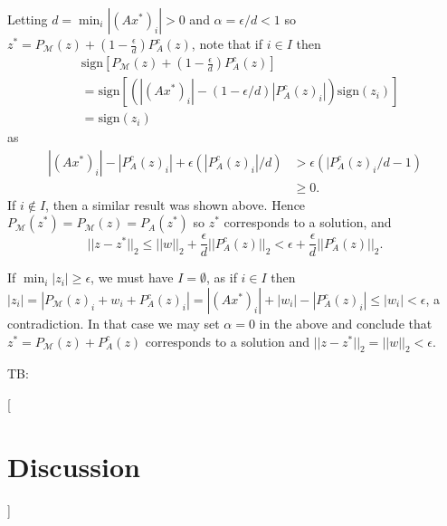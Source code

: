 \documentclass[journal]{IEEEtran}
\theoremstyle{definition}
\theoremstyle{remark}
\theoremstyle{definition}
\theoremstyle{problem}
\theoremstyle{definition}
\newcommand{\sign}{\text{sign}}
\newcommand{\MM}{\mathcal{M}}
\newcommand{\tb}[1]{{\color{blue}TB: {[#1]}}}
\begin{document}
Letting $d = \min_i|(Ax^*)_i| > 0$ and $\alpha = \epsilon/d<1$ so $z^* = P_{\MM}(z) + (1-\frac{\epsilon}{d})P_A^c(z)$, note that if $i\in I$ then
\[\begin{aligned}
&\sign\left[P_{\MM}(z) + (1-\frac{\epsilon}{d})P_A^c(z)\right] \\&= \sign\left[(|(Ax^*)_i|-(1-\epsilon/d)|P_A^c(z)_i|)\sign(z_i)\right] \\&= \sign(z_i)
\end{aligned}\]
as
\[\begin{aligned}
|(Ax^*)_i|-|P_A^c(z)_i|+\epsilon(|P_A^c(z)_i|/d)&>\epsilon\left(|P_A^c(z)_i/d - 1\right) \\& \geq 0.
\end{aligned}\]
 If $i\notin I$, then a similar result was shown above. Hence $P_{\MM}(z^*)=P_{\MM}(z) = P_A(z^*)$ so $z^*$ corresponds to a solution, and
\[||z-z^*||_2 \leq ||w||_2 + \frac{\epsilon}{d}||P_A^c(z)||_2 < \epsilon + \frac{\epsilon}{d}||P_A^c(z)||_2.\]

If $\min_i|z_i|\geq\epsilon$, we must have $I=\emptyset$, as if $i\in I$ then $|z_i| = |P_{\MM}(z)_i+w_i+P_A^c(z)_i|=|(Ax^*)_i| + |w_i| - |P_A^c(z)_i|\leq |w_i|<\epsilon$, a contradiction. In that case we may set $\alpha=0$ in the above and conclude that $z^* = P_{\MM}(z) + P_A^c(z)$ corresponds to a solution and $||z-z^*||_2 = ||w||_2<\epsilon$. 


\tb{\section{Discussion}}





\end{document}
